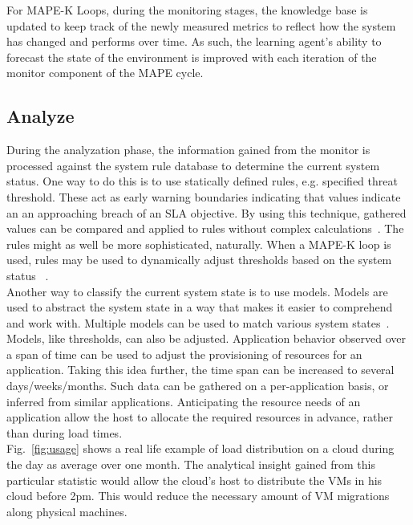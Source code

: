 \documentclass[a4paper]{llncs}
\begin{document}
For MAPE-K Loops, during the monitoring stages, the knowledge base is updated to keep track of the newly measured metrics to reflect how the system has changed and performs over time. As such, the learning agent’s ability to forecast the state of the environment is improved with each iteration of the monitor component of the MAPE cycle.

\subsection{Analyze}
During the analyzation phase, the information gained from the monitor is processed against the system rule database to determine the current system status. One way to do this is to use statically defined rules, e.g. specified threat threshold. These act as early warning boundaries indicating that values indicate an an approaching breach of an SLA objective. By using this technique, gathered values can be compared and applied to rules without complex calculations~\cite{Freitas10}. The rules might as well be more sophisticated, naturally.
When a MAPE-K loop is used, rules may be used to dynamically adjust thresholds based on the system status ~\cite{Emeakaroha10a}.\\

Another way to classify the current system state is to use models. Models are used to abstract the system state in a way that makes it easier to comprehend and work with. Multiple models can be used to match various system states~\cite{Shao10}.\\

Models, like thresholds, can also be adjusted. Application behavior observed over a span of time can be used to adjust the provisioning of resources for an application. Taking this idea further, the time span can be increased to several days/weeks/months. Such data can be gathered on a per-application basis, or inferred from similar applications. Anticipating the resource needs of an application allow the host to allocate the required resources in advance, rather than during load times.\\

Fig.~\ref{fig:usage} shows a real life example of load distribution on a cloud during the day as average over one month. The analytical insight gained from this particular statistic would allow the cloud’s host to distribute the VMs in his cloud before 2pm. This would reduce the necessary amount of VM migrations along physical machines.\\
\end{document}
